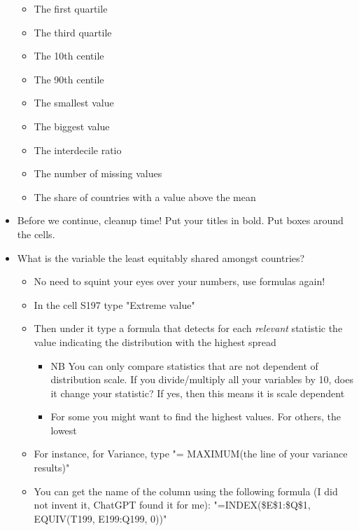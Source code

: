 \documentclass{article}
\begin{document}
\begin{itemize}
\begin{itemize}
            \item The first quartile
            \item The third quartile
            \item The 10th centile
            \item The 90th centile
            \item The smallest value
            \item The biggest value
            \item The interdecile ratio
            \item The number of missing values
            \item The share of countries with a value above the mean
        \end{itemize}
        \item Before we continue, cleanup time! Put your titles in bold. Put boxes around the cells. 
        \item What is the variable the least equitably shared amongst countries?
        \begin{itemize}
            \item No need to squint your eyes over your numbers, use formulas again!
            \item In the cell S197 type "Extreme value"
            \item Then under it type a formula that detects for each \textit{relevant}
            statistic the value indicating the distribution with the highest spread
            \begin{itemize}
                \item NB You can only compare statistics that are not dependent of distribution scale. If you divide/multiply all your variables by 10, does it change your statistic? If yes, then this means it is scale dependent
                \item For some you might want to find the highest values. For others, the lowest
            \end{itemize}
            \item For instance, for Variance, type "= MAXIMUM(the line of your variance results)"
            \item You can get the name of the column using the following formula (I did not invent it, ChatGPT found it for me): "=INDEX(\$E\$1:\$Q\$1, EQUIV(T199, E199:Q199, 0))"
        \end{itemize}
    \end{itemize}
\end{document}
